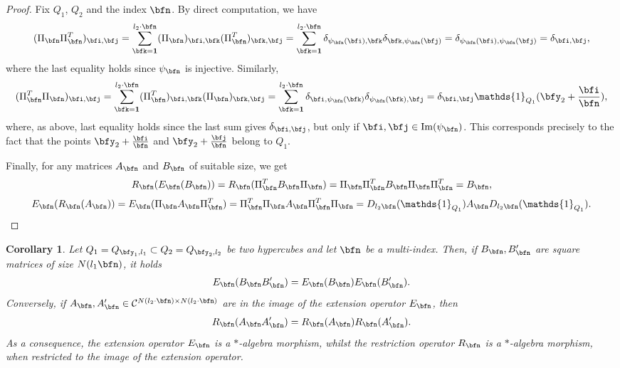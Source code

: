 \documentclass{amsart}
\newtheorem{cor}[thm]{Corollary}
\begin{document}

\begin{proof}
	Fix $Q_1$, $Q_2$ and the index $\bfn$. By direct computation, we have
	\begin{equation*}
		(\Pi_{\bfn}\Pi_{\bfn}^T)_{\bfi,\bfj}=\sum_{\bfk=\bf1}^{l_2\cdot\bfn}(\Pi_{\bfn})_{\bfi,\bfk}(\Pi_{\bfn}^T)_{\bfk,\bfj}=\sum_{\bfk=\bf1}^{l_2\cdot\bfn}\delta_{\psi_{\bfn}(\bfi),\bfk}\delta_{\bfk,\psi_{\bfn}(\bfj)}=\delta_{\psi_{\bfn}(\bfi),\psi_{\bfn}(\bfj)}=\delta_{\bfi,\bfj},
	\end{equation*}
	where the last equality holds since $\psi_{\bfn}$ is injective. Similarly,
	\begin{equation*}
		(\Pi_{\bfn}^T \Pi_{\bfn})_{\bfi,\bfj}=\sum_{\bfk=\bf1}^{l_2\cdot\bfn}(\Pi_{\bfn}^T)_{\bfi,\bfk}(\Pi_{\bfn})_{\bfk,\bfj}=\sum_{\bfk=\bf1}^{l_2\cdot\bfn}\delta_{\bfi,\psi_{\bfn}(\bfk)}\delta_{\psi_{\bfn}(\bfk),\bfj}=\delta_{\bfi,\bfj}\mathds{1}_{Q_1}(\bfy_2+\frac{\bfi}{\bfn}),
	\end{equation*}
	where, as above, last equality holds since the last sum gives $\delta_{\bfi,\bfj}$, but only if $\bfi,\bfj\in \mathrm{Im}(\psi_{\bfn})$. This corresponds precisely to the fact that the points $\bfy_2+\frac{\bfi}{\bfn}$ and $\bfy_2+\frac{\bfj}{\bfn}$ belong to $Q_1$. 
    
    Finally, for any matrices $A_\bfn$ and $B_\bfn$ of suitable size, we get
	\begin{equation*}
		R_{\bfn}(E_{\bfn}(B_{\bfn}))=R_{\bfn}(\Pi_{\bfn}^T B_{\bfn}\Pi_{\bfn})=\Pi_{\bfn}\Pi_{\bfn}^T B_{\bfn}\Pi_{\bfn}\Pi_{\bfn}^T=B_{\bfn},
	\end{equation*}
	\begin{equation*}
		E_{\bfn}(R_{\bfn}(A_{\bfn}))=E_{\bfn}(\Pi_{\bfn}A_{\bfn}\Pi_{\bfn}^T)=\Pi_{\bfn}^T \Pi_{\bfn}A_{\bfn}\Pi_{\bfn}^T\Pi_{\bfn} =D_{l_2\bfn}(\mathds{1}_{Q_1})A_{\bfn}D_{l_2\bfn}(\mathds{1}_{Q_1}).
	\end{equation*}
	
\end{proof}
\begin{cor}\label{product_hypercubes}
     Let $Q_1=Q_{{\bfy_1},l_1}\subset Q_2=Q_{{\bfy_2},l_2}$ be two hypercubes and let $\bfn$ be a multi-index. Then, if $B_\bfn,B'_\bfn$ are square matrices of size $N(l_1\bfn)$, it holds
     \begin{equation*}
         E_\bfn(B_\bfn B'_\bfn)=E_\bfn(B_\bfn)E_\bfn(B'_\bfn).
     \end{equation*}
     Conversely, if $A_\bfn,A'_\bfn\in\mathcal{C}^{N(l_2\cdot\bfn)\times N(l_2\cdot\bfn)}$ are in the image of the extension operator $E_\bfn$, then
     \begin{equation*}
         R_\bfn(A_\bfn A'_\bfn)=R_\bfn(A_\bfn)R_\bfn(A'_\bfn).
     \end{equation*}
     As a consequence, the extension operator $E_\bfn$ is a $*$-algebra morphism, whilst the restriction operator $R_\bfn$ is a $*$-algebra morphism, when restricted to the image of the extension operator. 
\end{cor}
\end{document}
